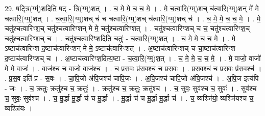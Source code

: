 \documentclass[17pt]{extarticle}
\begin{document}
29. षट्त्रि(ग्म्॑)श॒दिति॒ षट् - त्रि॒(ग्म्॒)श॒त् । . च॒ मे॒ मे॒ च॒ च॒ मे॒ । . मे॒ च॒त्वा॒रि॒(ग्म्॒)शच् च॑त्वारि॒(ग्म्॒)शन् मे॑ मे चत्वारि॒(ग्म्॒)शत् । . च॒त्वा॒रि॒(ग्म्॒)शच् च॑ च चत्वारि॒(ग्म्॒)शच् च॑त्वारि॒(ग्म्॒)शच् च॑ । . च॒ मे॒ मे॒ च॒ च॒ मे॒ । . मे॒ चतु॑श्चत्वारिꣳश॒च् चतु॑श्चत्वारिꣳशन् मे मे॒ चतु॑श्चत्वारिꣳशत् । . चतु॑श्चत्वारिꣳशच् च च॒ चतु॑श्चत्वारिꣳश॒च् चतु॑श्चत्वारिꣳशच् च । . चतु॑श्चत्वारिꣳश॒दिति॒ चतुः॑ - च॒त्वा॒रि॒(ग्म्॒)श॒त् । . च॒ मे॒ मे॒ च॒ च॒ मे॒ । . मे॒ ऽष्टाच॑त्वारिꣳश द॒ष्टाच॑त्वारिꣳशन् मे मे॒ ऽष्टाच॑त्वारिꣳशत् । . अ॒ष्टाच॑त्वारिꣳशच् च चा॒ष्टाच॑त्वारिꣳश द॒ष्टाच॑त्वारिꣳशच् च । . अ॒ष्टाच॑त्वारिꣳश॒दित्य॒ष्टा - च॒त्वा॒रि॒(ग्म्॒)श॒त् । . च॒ मे॒ मे॒ च॒ च॒ मे॒ । . मे॒ वाजो॒ वाजो॑ मे मे॒ वाजः॑ । . वाज॑श्च च॒ वाजो॒ वाज॑श्च । . च॒ प्र॒स॒वः प्र॑स॒वश्च॑ च प्रस॒वः । . प्र॒स॒वश्च॑ च प्रस॒वः प्र॑स॒वश्च॑ । . प्र॒स॒व इति॑ प्र - स॒वः । . चा॒पि॒जो अ॑पि॒जश्च॑ चापि॒जः । . अ॒पि॒जश्च॑ चापि॒जो अ॑पि॒जश्च॑ । . अ॒पि॒ज इत्य॑पि - जः । . च॒ क्रतुः॒ क्रतु॑श्च च॒ क्रतुः॑ । . क्रतु॑श्च च॒ क्रतुः॒ क्रतु॑श्च । . च॒ सुवः॒ सुव॑श्च च॒ सुवः॑ । . सुव॑श्च च॒ सुवः॒ सुव॑श्च । . च॒ मू॒र्द्धा मू॒र्द्धा च॑ च मू॒र्द्धा । . मू॒र्द्धा च॑ च मू॒र्द्धा मू॒र्द्धा च॑ । . च॒ व्यश्ञि॑यो॒ व्यश्ञि॑यश्च च॒ व्यश्ञि॑यः । \newline
\end{document}
